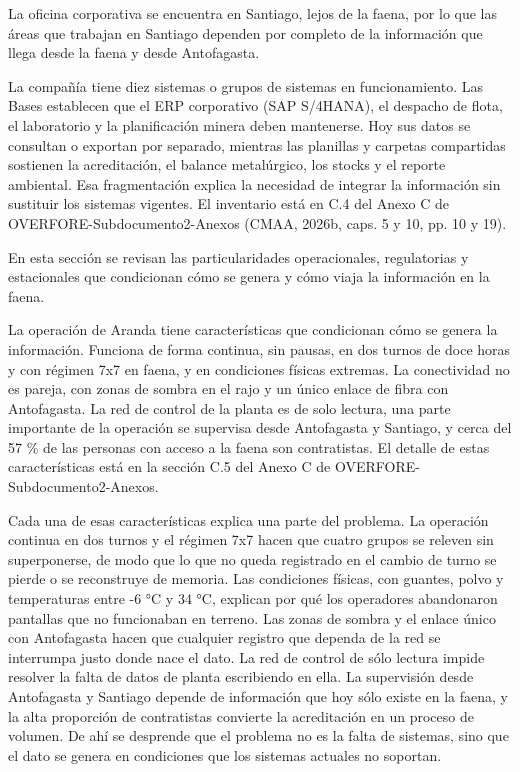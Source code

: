 \documentclass[subdoc]{../../comun/overfore}
\begin{document}
La oficina corporativa se encuentra en Santiago, lejos de la faena, por lo que las áreas que trabajan en Santiago dependen por completo de la información que llega desde la faena y desde Antofagasta.

La compañía tiene diez sistemas o grupos de sistemas en funcionamiento. Las Bases establecen que el ERP corporativo (SAP S/4HANA), el despacho de flota, el laboratorio y la planificación minera deben mantenerse. Hoy sus datos se consultan o exportan por separado, mientras las planillas y carpetas compartidas sostienen la acreditación, el balance metalúrgico, los stocks y el reporte ambiental. Esa fragmentación explica la necesidad de integrar la información sin sustituir los sistemas vigentes. El inventario está en C.4 del Anexo C de OVERFORE-Subdocumento2-Anexos (CMAA, 2026b, caps. 5 y 10, pp. 10 y 19).

En esta sección se revisan las particularidades operacionales, regulatorias y estacionales que condicionan cómo se genera y cómo viaja la información en la faena.

La operación de Aranda tiene características que condicionan cómo se genera la información. Funciona de forma continua, sin pausas, en dos turnos de doce horas y con régimen 7x7 en faena, y en condiciones físicas extremas. La conectividad no es pareja, con zonas de sombra en el rajo y un único enlace de fibra con Antofagasta. La red de control de la planta es de solo lectura, una parte importante de la operación se supervisa desde Antofagasta y Santiago, y cerca del 57 \% de las personas con acceso a la faena son contratistas. El detalle de estas características está en la sección C.5 del Anexo C de OVERFORE-Subdocumento2-Anexos.

Cada una de esas características explica una parte del problema. La operación continua en dos turnos y el régimen 7x7 hacen que cuatro grupos se releven sin superponerse, de modo que lo que no queda registrado en el cambio de turno se pierde o se reconstruye de memoria. Las condiciones físicas, con guantes, polvo y temperaturas entre -6 °C y 34 °C, explican por qué los operadores abandonaron pantallas que no funcionaban en terreno. Las zonas de sombra y el enlace único con Antofagasta hacen que cualquier registro que dependa de la red se interrumpa justo donde nace el dato. La red de control de sólo lectura impide resolver la falta de datos de planta escribiendo en ella. La supervisión desde Antofagasta y Santiago depende de información que hoy sólo existe en la faena, y la alta proporción de contratistas convierte la acreditación en un proceso de volumen. De ahí se desprende que el problema no es la falta de sistemas, sino que el dato se genera en condiciones que los sistemas actuales no soportan.
\end{document}
